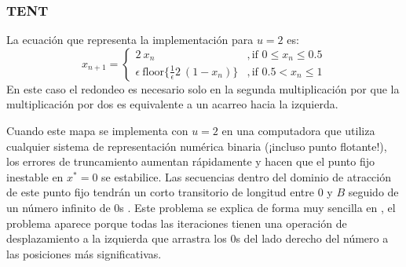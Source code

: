 \subsubsection{TENT} \label{sssec:tent}

La ecuación que representa la implementación para $u=2$ es:
%
\begin{equation}\label{eq:tent2B2}
x_{n+1} = 
\begin{cases}
2~x_n &, \textrm{if } 0\leq x_n\leq 0.5\\
\epsilon ~\text{floor} \{\frac{1}{\epsilon} 2~(1-x_n)\} &, \textrm{if } 0.5<x_n\leq 1 
\end{cases}	
\end{equation}
%
En este caso el redondeo es necesario solo en la segunda multiplicación por que la multiplicación por dos es equivalente a un acarreo hacia la izquierda.

Cuando este mapa se implementa con $u=2$ en una computadora que utiliza cualquier sistema de representación numérica binaria (¡incluso punto flotante!), los errores de truncamiento aumentan rápidamente y hacen que el punto fijo inestable en $x^* = 0$ se estabilice.
Las secuencias dentro del dominio de atracción de este punto fijo tendrán un corto transitorio de longitud entre $0$ y $B$ seguido de un número infinito de $0$s \cite{Jessa2002, Callegari}.
Este problema se explica de forma muy sencilla en \cite{Li2004}, el problema aparece porque todas las iteraciones tienen una operación de desplazamiento a la izquierda que arrastra los $0$s del lado derecho del número a las posiciones más significativas.

